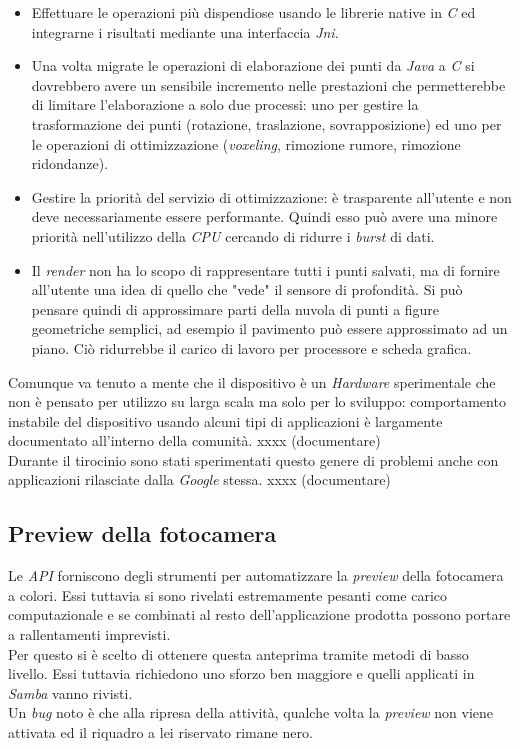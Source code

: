 \begin{itemize}
	\item Effettuare le operazioni più dispendiose usando le librerie native in \emph{C} ed integrarne i risultati mediante una interfaccia \emph{Jni}.
	\item Una volta migrate le operazioni di elaborazione dei punti da \emph{Java} a \emph{C} si dovrebbero avere un sensibile incremento nelle prestazioni che permetterebbe di limitare l'elaborazione a solo due processi: uno per gestire la trasformazione dei punti (rotazione, traslazione, sovrapposizione) ed uno per le operazioni di ottimizzazione (\emph{voxeling}, rimozione rumore, rimozione ridondanze).
	\item Gestire la priorità del servizio di ottimizzazione: è trasparente all'utente e non deve necessariamente essere performante. Quindi esso può avere una minore priorità nell'utilizzo della \emph{CPU} cercando di ridurre i \emph{burst} di dati.
	\item Il \emph{render} non ha lo scopo di rappresentare tutti i punti salvati, ma di fornire all'utente una idea di quello che "vede" il sensore di profondità. Si può pensare quindi di approssimare parti della nuvola di punti a figure geometriche semplici, ad esempio il pavimento può essere approssimato ad un piano. Ciò ridurrebbe il carico di lavoro per processore e scheda grafica.
\end{itemize}
Comunque va tenuto a mente che il dispositivo è un \emph{Hardware} sperimentale che non è pensato per utilizzo su larga scala ma solo per lo sviluppo: comportamento instabile del dispositivo usando alcuni tipi di applicazioni è largamente documentato all'interno della comunità. xxxx (documentare)\\
Durante il tirocinio sono stati sperimentati questo genere di problemi anche con applicazioni rilasciate dalla \emph{Google} stessa. xxxx (documentare)

\subsection{Preview della fotocamera}
Le \emph{API} forniscono degli strumenti per automatizzare la \emph{preview} della fotocamera a colori. Essi tuttavia si sono rivelati estremamente pesanti come carico computazionale e se combinati al resto dell'applicazione prodotta possono portare a rallentamenti imprevisti.\\
Per questo si è scelto di ottenere questa anteprima tramite metodi di basso livello. Essi tuttavia richiedono uno sforzo ben maggiore e quelli applicati in \emph{Samba} vanno rivisti.\\
Un \emph{bug} noto è che alla ripresa della attività, qualche volta la \emph{preview} non viene attivata ed il riquadro a lei riservato rimane nero.


